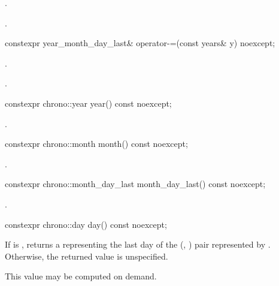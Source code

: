 \begin{itemdescr}
\pnum
\effects
{}.

\pnum
\returns
{}.
\end{itemdescr}

%
\begin{itemdecl}
constexpr year_month_day_last& operator-=(const years& y) noexcept;
\end{itemdecl}

\begin{itemdescr}
\pnum
\effects
{}.

\pnum
\returns
{}.
\end{itemdescr}

%
\begin{itemdecl}
constexpr chrono::year year() const noexcept;
\end{itemdecl}

\begin{itemdescr}
\pnum
\returns
{}.
\end{itemdescr}

%
\begin{itemdecl}
constexpr chrono::month month() const noexcept;
\end{itemdecl}

\begin{itemdescr}
\pnum
\returns
{}.
\end{itemdescr}

%
\begin{itemdecl}
constexpr chrono::month_day_last month_day_last() const noexcept;
\end{itemdecl}

\begin{itemdescr}
\pnum
\returns
{}.
\end{itemdescr}

%
\begin{itemdecl}
constexpr chrono::day day() const noexcept;
\end{itemdecl}

\begin{itemdescr}
\pnum
\returns
If  is ,
returns a  representing
the last day of the (, ) pair
represented by .
Otherwise, the returned value is unspecified.

\pnum
\begin{note}
This value may be computed on demand.
\end{note}
\end{itemdescr}

